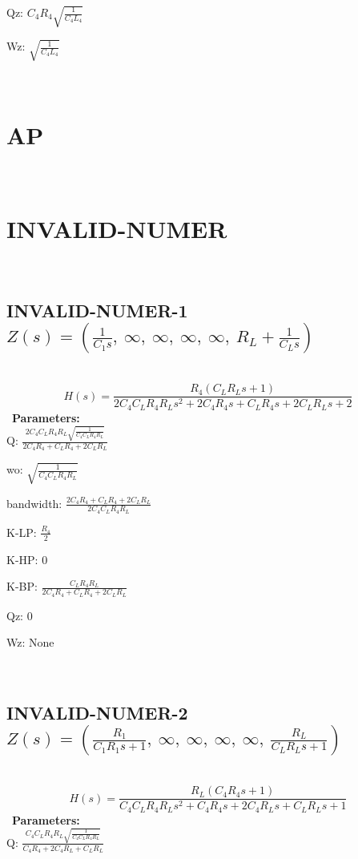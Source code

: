 \documentclass{article}
\begin{document}
Qz: $C_{4} R_{4} \sqrt{\frac{1}{C_{4} L_{4}}}$\ 

Wz: $\sqrt{\frac{1}{C_{4} L_{4}}}$\ 

\ 

\section{AP}\ 
\section{INVALID-NUMER}\ 
\subsection{INVALID-NUMER-1 $Z(s) = \left( \frac{1}{C_{1} s}, \  \infty, \  \infty, \  \infty, \  \infty, \  R_{L} + \frac{1}{C_{L} s}\right)$ } \ 
\textbf{\[H(s) = \frac{R_{4} \left(C_{L} R_{L} s + 1\right)}{2 C_{4} C_{L} R_{4} R_{L} s^{2} + 2 C_{4} R_{4} s + C_{L} R_{4} s + 2 C_{L} R_{L} s + 2}\] } \ 
\textbf{Parameters:}\\ 

Q: $\frac{2 C_{4} C_{L} R_{4} R_{L} \sqrt{\frac{1}{C_{4} C_{L} R_{4} R_{L}}}}{2 C_{4} R_{4} + C_{L} R_{4} + 2 C_{L} R_{L}}$\ 

wo: $\sqrt{\frac{1}{C_{4} C_{L} R_{4} R_{L}}}$\ 

bandwidth: $\frac{2 C_{4} R_{4} + C_{L} R_{4} + 2 C_{L} R_{L}}{2 C_{4} C_{L} R_{4} R_{L}}$\ 

K-LP: $\frac{R_{4}}{2}$\ 

K-HP: $0$\ 

K-BP: $\frac{C_{L} R_{4} R_{L}}{2 C_{4} R_{4} + C_{L} R_{4} + 2 C_{L} R_{L}}$\ 

Qz: $0$\ 

Wz: $\text{None}$\ 

\ 

\subsection{INVALID-NUMER-2 $Z(s) = \left( \frac{R_{1}}{C_{1} R_{1} s + 1}, \  \infty, \  \infty, \  \infty, \  \infty, \  \frac{R_{L}}{C_{L} R_{L} s + 1}\right)$ } \ 
\textbf{\[H(s) = \frac{R_{L} \left(C_{4} R_{4} s + 1\right)}{C_{4} C_{L} R_{4} R_{L} s^{2} + C_{4} R_{4} s + 2 C_{4} R_{L} s + C_{L} R_{L} s + 1}\] } \ 
\textbf{Parameters:}\\ 

Q: $\frac{C_{4} C_{L} R_{4} R_{L} \sqrt{\frac{1}{C_{4} C_{L} R_{4} R_{L}}}}{C_{4} R_{4} + 2 C_{4} R_{L} + C_{L} R_{L}}$\ 
\end{document}
